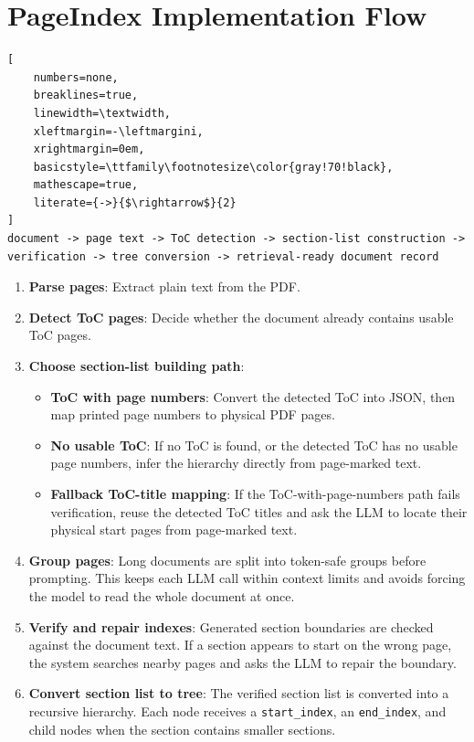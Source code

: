 \documentclass[11pt,a4paper]{article}
\newcommand{\fieldname}[1]{\textcolor{red!70!black}{\texttt{#1}}}
\begin{document}
\section{PageIndex Implementation Flow}


\begin{lstlisting}[
    numbers=none,
    breaklines=true,
    linewidth=\textwidth,
    xleftmargin=-\leftmargini,
    xrightmargin=0em,
    basicstyle=\ttfamily\footnotesize\color{gray!70!black},
    mathescape=true,
    literate={->}{$\rightarrow$}{2}
]
document -> page text -> ToC detection -> section-list construction -> verification -> tree conversion -> retrieval-ready document record
\end{lstlisting}

\begin{enumerate}
    \item \textbf{Parse pages}: Extract plain text from the PDF.
    \item \textbf{Detect ToC pages}: Decide whether the document already contains usable ToC pages.
    \item \textbf{Choose section-list building path}: 
    \begin{itemize}
        \item \textbf{ToC with page numbers}: Convert the detected ToC into JSON, then map printed page numbers to physical PDF pages.
        \item \textbf{No usable ToC}: If no ToC is found, or the detected ToC has no usable page numbers, infer the hierarchy directly from page-marked text.
        \item \textbf{Fallback ToC-title mapping}: If the ToC-with-page-numbers path fails verification, reuse the detected ToC titles and ask the LLM to locate their physical start pages from page-marked text.
    \end{itemize}   
    \item \textbf{Group pages}: Long documents are split into token-safe groups before prompting. This keeps each LLM call within context limits and avoids forcing the model to read the whole document at once.
    \item \textbf{Verify and repair indexes}: Generated section boundaries are checked against the document text. If a section appears to start on the wrong page, the system searches nearby pages and asks the LLM to repair the boundary.
    \item \textbf{Convert section list to tree}: The verified section list is converted into a recursive hierarchy. Each node receives a \fieldname{start\_index}, an \fieldname{end\_index}, and child nodes when the section contains smaller sections.

\end{enumerate}
\end{document}

